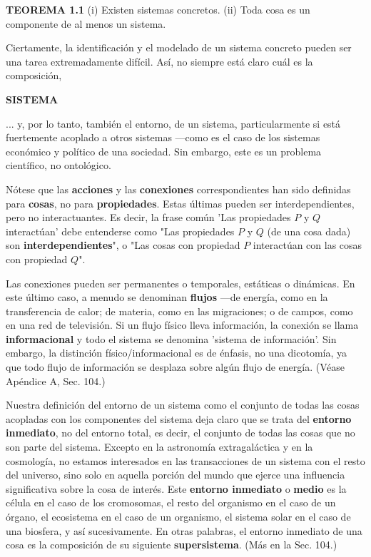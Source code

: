 {\textbf{TEOREMA 1.1} (i) Existen sistemas concretos. (ii) Toda cosa es un componente de al menos un sistema.

Ciertamente, la identificación y el modelado de un sistema concreto pueden ser una tarea extremadamente difícil. Así, no siempre está claro cuál es la composición,
}

\fancyhf{}
\fancyhead[r]{\thepage}
\newpage
\begin{center}
{\fontsize{13}{16}\selectfont \textbf{SISTEMA}}
\end{center}
\vspace{0.5cm}

{\fontsize{13}{15}\selectfont
... y, por lo tanto, también el entorno, de un sistema, particularmente si está fuertemente acoplado a otros sistemas —como es el caso de los sistemas económico y político de una sociedad. Sin embargo, este es un problema científico, no ontológico.

Nótese que las \textbf{acciones} y las \textbf{conexiones} correspondientes han sido definidas para \textbf{cosas}, no para \textbf{propiedades}. Estas últimas pueden ser interdependientes, pero no interactuantes. Es decir, la frase común 'Las propiedades $P$ y $Q$ interactúan' debe entenderse como "Las propiedades $P$ y $Q$ (de una cosa dada) son \textbf{interdependientes}", o "Las cosas con propiedad $P$ interactúan con las cosas con propiedad $Q$".

Las conexiones pueden ser permanentes o temporales, estáticas o dinámicas. En este último caso, a menudo se denominan \textbf{flujos} —de energía, como en la transferencia de calor; de materia, como en las migraciones; o de campos, como en una red de televisión. Si un flujo físico lleva información, la conexión se llama \textbf{informacional} y todo el sistema se denomina 'sistema de información'. Sin embargo, la distinción físico/informacional es de énfasis, no una dicotomía, ya que todo flujo de información se desplaza sobre algún flujo de energía. (Véase Apéndice A, Sec. 104.)

Nuestra definición del entorno de un sistema como el conjunto de todas las cosas acopladas con los componentes del sistema deja claro que se trata del \textbf{entorno inmediato}, no del entorno total, es decir, el conjunto de todas las cosas que no son parte del sistema. Excepto en la astronomía extragaláctica y en la cosmología, no estamos interesados en las transacciones de un sistema con el resto del universo, sino solo en aquella porción del mundo que ejerce una influencia significativa sobre la cosa de interés. Este \textbf{entorno inmediato} o \textbf{medio} es la célula en el caso de los cromosomas, el resto del organismo en el caso de un órgano, el ecosistema en el caso de un organismo, el sistema solar en el caso de una biosfera, y así sucesivamente. En otras palabras, el entorno inmediato de una cosa es la composición de su siguiente \textbf{supersistema}. (Más en la Sec. 104.)

}
